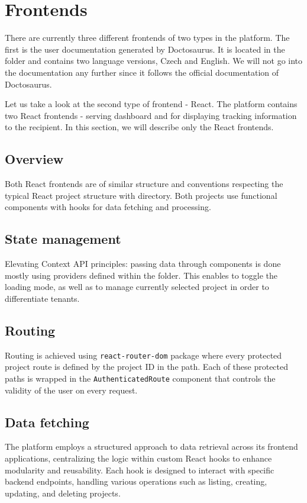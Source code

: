 \section{Frontends}
\label{attachments:programming-platform.frontend}
There are currently three different frontends of two types in the platform.
The first is the user documentation generated by Doctosaurus.
It is located in the  folder and contains two language versions, Czech and English.
We will not go into the documentation any further since it follows the official documentation of Doctosaurus.

Let us take a look at the second type of frontend - React.
The platform contains two React frontends -  serving dashboard and  for displaying tracking information to the recipient.
In this section, we will describe only the React frontends.

\subsection{Overview}
Both React frontends are of similar structure and conventions respecting the typical React project structure with  directory.
Both projects use functional components with hooks for data fetching and processing.

\subsection{State management}
Elevating Context API principles: passing data through components is done mostly using providers defined within the  folder. 
This enables to toggle the loading mode, as well as to manage currently selected project in order to differentiate tenants.

\subsection{Routing}
Routing is achieved using \texttt{react-router-dom} package where every protected project route is defined by the project ID in the path. 
Each of these protected paths is wrapped in the \texttt{AuthenticatedRoute} component that controls the validity of the user on every request.

\subsection{Data fetching}
The platform employs a structured approach to data retrieval across its frontend applications, centralizing the logic within custom React hooks to enhance modularity and reusability. 
Each hook is designed to interact with specific backend endpoints, handling various operations such as listing, creating, updating, and deleting projects. 

